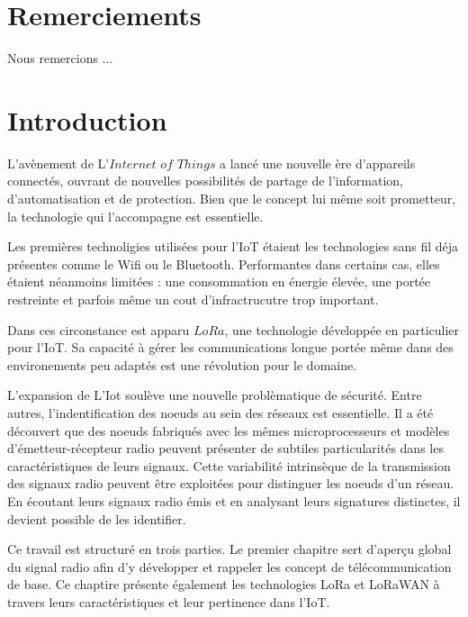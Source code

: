 \documentclass[12pt,a4paper,oneside, titlepage]{report}
\begin{document}
{}
\chapter*{Remerciements}
\renewcommand{\leftmark}{REMERCIEMENTS}

Nous remercions ...\\

\newpage
\renewcommand{\leftmark}{TABLE DES MATI\`{E}RES}
\thispagestyle{fancy}
\tableofcontents


\newpage
{}
\renewcommand{\leftmark}{INTRODUCTION}

\chapter*{Introduction}

L'avènement de L'$Internet$ $of$ $Things$ a lancé une nouvelle ère d'appareils connectés, ouvrant de nouvelles possibilités de partage de l'information, d'automatisation et de protection. Bien que le concept lui même soit prometteur, la technologie qui l'accompagne est essentielle.

Les premières technoligies utilisées pour l'IoT étaient les technologies sans fil déja présentes comme le Wifi ou le Bluetooth. Performantes dans certains cas, elles étaient néanmoins limitées : une consommation en énergie élevée, une portée restreinte et parfois même un cout d'infractrucutre trop important.

Dans ces circonstance est apparu $LoRa$, une technologie développée en particulier pour l'IoT. Sa capacité à gérer les communications longue portée même dans des environements peu adaptés est une révolution pour le domaine.

L'expansion de L'Iot soulève une nouvelle problèmatique de sécurité. Entre autres, l'indentification des noeuds au sein des réseaux est essentielle. Il a été découvert que des noeuds fabriqués avec les mêmes microprocesseurs et modèles d'émetteur-récepteur radio peuvent présenter de subtiles particularités dans les caractéristiques de leurs signaux. Cette variabilité intrinsèque de la transmission des signaux radio peuvent être exploitées pour distinguer les noeuds d’un réseau. En écoutant leurs signaux radio émis et en analysant leurs signatures distinctes, il devient possible de les identifier.

Ce travail est structuré en trois parties. Le premier chapitre sert d'aperçu global du signal radio afin d'y développer et rappeler les concept de télécommunication de base. Ce chaptire présente également les technologies LoRa et LoRaWAN à travers leurs caractéristiques et leur pertinence dans l'IoT.
\end{document}
